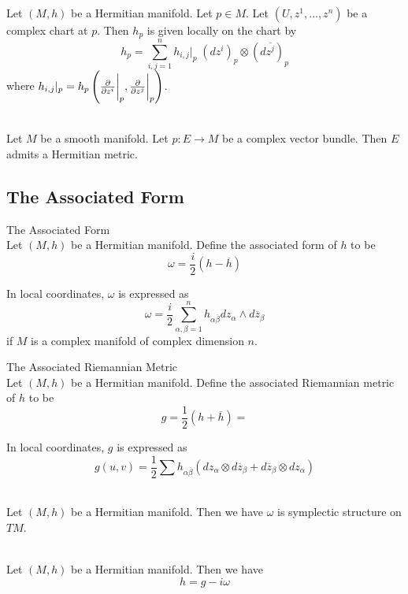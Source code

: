 \documentclass[a4paper]{article}
\begin{document}
\begin{prp}{}{}\\
Let $(M,h)$ be a Hermitian manifold. Let $p\in M$. Let $(U,z^1,\dots,z^n)$ be a complex chart at $p$. Then $h_p$ is given locally on the chart by $$h_p=\sum_{i,j=1}^nh_{i,j}|_p\;(dz^i)_p\otimes(d\overline{z^j})_p$$ where $h_{i,j}|_p=h_p\left(\frac{\partial}{\partial z^i}\bigg{|}_p,\frac{\partial}{\partial z^j}\bigg{|}_p\right)$. 
\end{prp}

\begin{prp}{}{}\\
Let $M$ be a smooth manifold. Let $p:E\to M$ be a complex vector bundle. Then $E$ admits a Hermitian metric. 
\end{prp}

\subsection{The Associated Form}
\begin{defn}{The Associated Form}{}\\
Let $(M,h)$ be a Hermitian manifold. Define the associated form of $h$ to be $$\omega=\frac{i}{2}(h-\overline{h})$$
\end{defn}

In local coordinates, $\omega$ is expressed as $$\omega=\frac{i}{2}\sum_{\alpha,\beta=1}^n h_{\alpha\overline{\beta}}dz_{\alpha}\wedge d\overline{z}_\beta$$ if $M$ is a complex manifold of complex dimension $n$. 

\begin{defn}{The Associated Riemannian Metric}{}\\
Let $(M,h)$ be a Hermitian manifold. Define the associated Riemannian metric of $h$ to be $$g=\frac{1}{2}(h+\overline{h})=$$
\end{defn}

In local coordinates, $g$ is expressed as $$g(u,v)=\frac{1}{2}\sum h_{\alpha\overline{\beta}}(dz_\alpha\otimes d\overline{z}_\beta+d\overline{z}_\beta\otimes dz_\alpha)$$

\begin{lmm}{}{}\\
Let $(M,h)$ be a Hermitian manifold. Then we have $\omega$ is symplectic structure on $TM$. 
\end{lmm}

\begin{lmm}{}{}\\
Let $(M,h)$ be a Hermitian manifold. Then we have $$h=g-i\omega$$
\end{lmm}
\end{document}
